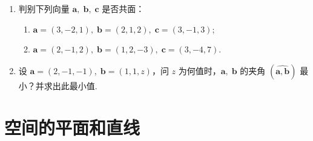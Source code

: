 \begin{enumerate}
    \item 判别下列向量 $\boldsymbol{a},\;\boldsymbol{b},\;\boldsymbol{c}$ 是否共面：
    \begin{enumerate}[(1)]\setlength{\itemsep}{5pt}\setlength{\topsep}{15pt}
        \item $\boldsymbol{a}=(3, -2, 1),\;\boldsymbol{b}=(2, 1, 2),\;\boldsymbol{c}=(3, -1, 3)$;
        \item $\boldsymbol{a}=(2, -1, 2),\;\boldsymbol{b}=(1, 2, -3),\;\boldsymbol{c}=(3, -4, 7)$.
    \end{enumerate}

    \item 设 $\boldsymbol{a}=(2, -1, -1),\;\boldsymbol{b}=(1, 1, z)$，问 $z$ 为何值时，$\boldsymbol{a},\;\boldsymbol{b}$ 的夹角 $(\widehat{\boldsymbol{a}, \boldsymbol{b}})$ 最小？并求出此最小值.
\end{enumerate}

\section{空间的平面和直线}

